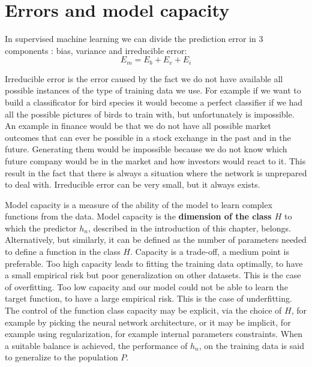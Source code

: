 \section{Errors and model capacity}
\label{s:errors_model_capacity}

In supervised machine learning we can divide the prediction error in 3 components \cite{bias_variance}: bias, variance and irreducible error:
$$E_m = E_b + E_v + E_i$$

Irreducible error is the error caused by the fact we do not have available all possible instances of the type of training data we use. For example if we want to build a classificator for bird species it would become a perfect classifier if we had all the possible pictures of birds to train with, but unfortunately is impossible. An example in finance would be that we do not have all possible market outcomes that can ever be possible in a stock exchange in the past and in the future. Generating them would be impossible because we do not know which future company would be in the market and how investors would react to it. This result in the fact that there is always a situation where the network is unprepared to deal with. Irreducible error can be very small, but it always exists.

\hfill \break

Model capacity is a measure of the ability of the model to learn complex functions from the data. Model capacity is the \textbf{dimension of the class $H$} to which the predictor $h_n$, described in the introduction of this chapter, belongs. Alternatively, but similarly, it can be defined as the number of parameters needed to define a function in the class $H$. Capacity is a trade-off, a medium point is preferable. Too high capacity leads to fitting the training data optimally, to have a small empirical risk but poor generalization on other datasets. This is the case of overfitting. Too low capacity and our model could not be able to learn the target function, to have a large empirical risk. This is the case of underfitting. The control of the function class capacity may be explicit, via the choice of $H$, for example by picking the neural network architecture, or it may be implicit, for example using regularization, for example internal parameters constraints. When a suitable balance is achieved, the performance of $h_n$, on the training data is said to generalize to the population $P$. 

\hfill \break

